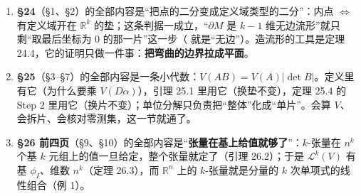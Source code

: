 \documentclass[11pt]{ctexart}
\newcommand{\Vvol}{V}
\begin{document}
\begin{enumerate}
  \item \textbf{§24}（§1、§2）的全部内容是“把点的二分变成定义域类型的二分”：内点 $\iff$ 有定义域开在 $\mathbb{R}^k$ 的垫；这条判据一成立，“$\partial M$ 是 $k-1$ 维无边流形”就只剩“取最后坐标为 $0$ 的那一片”这一步（ 就是“无边”）。造流形的工具是定理 24.4，它的证明只做一件事：\textbf{把弯曲的边界拉成平面}。
  \item \textbf{§25}（§3--§7）的全部内容是一条小代数：$\Vvol(AB)=\Vvol(A)|\det B|$。定义里有它（为什么要乘 $\Vvol(D\alpha)$），引理 25.1 里用它（换垫不变），定理 25.4 的 Step 2 里用它（换片不变）；单位分解只负责把“整体”化成“单片”。会算 $\Vvol$、会拆片、会核对零测集，这一节就通了。
  \item \textbf{§26 前四页}（§9、§10）的全部内容是“\textbf{张量在基上给值就够了}”：$k$-张量在 $n^k$ 个基 $k$ 元组上的值一旦给定，整个张量就定了（引理 26.2）；于是 $\mathcal{L}^k(V)$ 有基 $\phi_I$、维数 $n^k$（定理 26.3），而 $\mathbb{R}^n$ 上的 $k$-张量就是分量的 $k$ 次单项式的线性组合（例 1）。
\end{enumerate}

\end{document}
